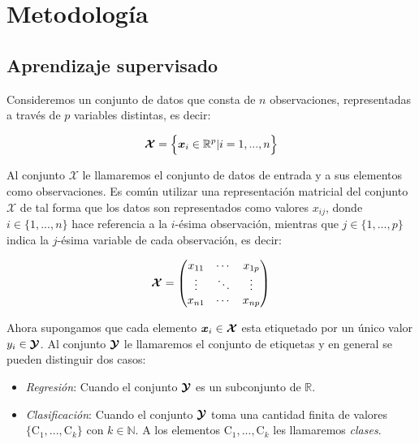 
\chapter{Metodología}

\section{Aprendizaje supervisado}

Consideremos un conjunto de datos que consta de $n$ observaciones, representadas a través de $p$ variables distintas, es decir:

\begin{equation*}
    \boldsymbol{\mathcal{X}} = \Big\{\boldsymbol{x}_i \in \mathbb{R}^p | i = 1,...,n \Big\}
\end{equation*}

Al conjunto $\boldsymbol{\mathcal{X}}$ le llamaremos el conjunto de datos de entrada y a sus elementos como observaciones. Es común utilizar una representación matricial del conjunto $\boldsymbol{\mathcal{X}}$ de tal forma que los datos son representados como valores $x_{ij}$, donde $i \in \{1,...,n\}$ hace referencia a la $i$-ésima observación, mientras que $j \in \{1,...,p\}$ indica la $j$-ésima variable de cada observación, es decir:

\begin{equation*}
    \boldsymbol{\mathcal{X}} = 
    \begin{pmatrix}
        x_{11} & \cdots & x_{1p} \\
        \vdots & \ddots & \vdots \\
        x_{n1} & \cdots & x_{np}
    \end{pmatrix}
\end{equation*}

Ahora supongamos que cada elemento $\boldsymbol{x}_i \in \boldsymbol{\mathcal{X}}$ esta etiquetado por un único valor $y_i \in \boldsymbol{\mathcal{Y}}$. Al conjunto $\boldsymbol{\mathcal{Y}}$ le llamaremos el conjunto de etiquetas y en general se pueden distinguir dos casos:

\begin{itemize}
    \item \textit{Regresión}: Cuando el conjunto $\boldsymbol{\mathcal{Y}}$ es un subconjunto de $\mathbb{R}$.
    \item \textit{Clasificación}: Cuando el conjunto $\boldsymbol{\mathcal{Y}}$ toma una cantidad finita de valores $\{\mathrm{C}_1,...,\mathrm{C}_k\}$ con $k \in \mathbb{N}$. A los elementos $\mathrm{C}_1,...,\mathrm{C}_k$ les llamaremos \textit{clases}.
\end{itemize}

